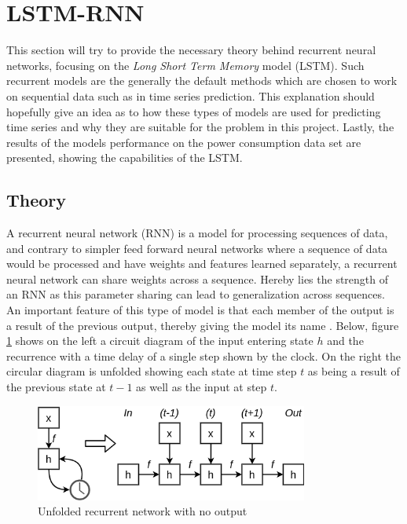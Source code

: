 \documentclass[main.tex]{subfiles}
\begin{document}
\section{LSTM-RNN}
This section will try to provide the necessary theory behind recurrent neural networks, focusing on the \textit{Long Short Term Memory} model (LSTM). Such recurrent models are the generally the default methods which are chosen to work on sequential data such as in time series prediction. This explanation should hopefully give an idea as to how these types of models are used for predicting time series and why they are suitable for the problem in this project. Lastly, the results of the models performance on the power consumption data set are presented, showing the capabilities of the LSTM. 

\subsection{Theory}
A recurrent neural network (RNN) is a model for processing sequences of data, and contrary to simpler feed forward neural networks where a sequence of data would be processed and have weights and features learned separately, a recurrent neural network can share weights across a sequence. Hereby lies the strength of an RNN as this parameter sharing can lead to generalization across sequences. An important feature of this type of model is that each member of the output is a result of the previous output, thereby giving the model its name \cite{Goodfellow-et-al-2016}. Below, figure \ref{fig:RNN unfolded} shows on the left a circuit diagram of the input entering state \textit{$h$} and the recurrence with a time delay of a single step shown by the clock. On the right the circular diagram is unfolded showing each state at time step \textit{$t$} as being a result of the previous state at \textit{$t-1$} as well as the input at step \textit{$t$}.

\begin{figure}[H]
\centering
\includegraphics[width=0.8\textwidth]{Figures/rnnunfold.png}
\caption{Unfolded recurrent network with no output}
\label{fig:RNN unfolded}
\end{figure}
\end{document}
